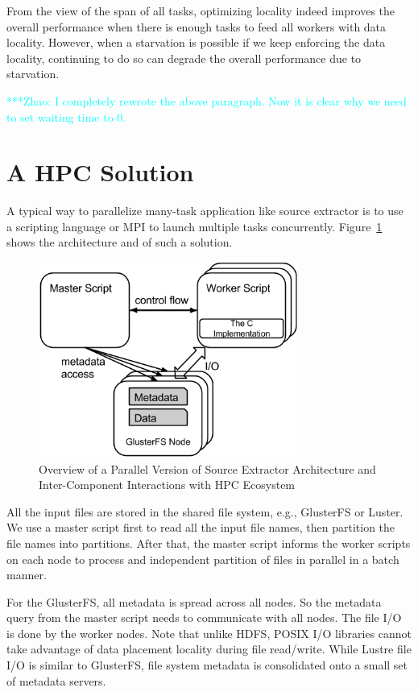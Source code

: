 \documentclass[conference]{IEEEtran}
\newcommand{\zhaonote}[1]{{\textcolor{cyan}    { ***Zhao:      #1 }}}
\newcommand{\zhaonote}[1]{}
\newcommand{\up}{\vspace*{-1em}}
\begin{document}
From the view of the span of all tasks, optimizing locality indeed improves the overall performance when there is enough
tasks to feed all workers with data locality. However, when a starvation is possible if we keep
enforcing the data locality, continuing to do so can degrade the overall performance due to starvation.

\zhaonote{I completely rewrote the above paragraph. Now it is clear why we need to set waiting time to 0.}

\section{A HPC Solution}
A typical way to parallelize many-task application like source extractor is to use a scripting language
or MPI to launch multiple tasks concurrently. Figure~\ref{fig:hpc-architecture} shows the architecture and
of such a solution.

\begin{figure}[t]
	\begin{center}
		\includegraphics[width=85mm]{pictures/HPC-Architecture}
		\caption{Overview of a Parallel Version of Source Extractor Architecture and Inter-Component Interactions with HPC Ecosystem}
		\label{fig:hpc-architecture}
		\up\up
  	\end{center}
\end{figure}

All the input files are stored in the shared file system, e.g., GlusterFS or Luster. We use a master script
first to read all the input file names, then partition the file names into partitions. After that, the master
script informs the worker scripts on each node to process and independent partition of files in parallel 
in a batch manner.

For the GlusterFS, all metadata is spread across all nodes. So the metadata query from the master script
needs to communicate with all nodes. The file I/O is done by the worker nodes. Note that unlike HDFS, 
POSIX I/O libraries cannot take advantage of data placement locality during file read/write. While Lustre 
file I/O is similar to GlusterFS, file system metadata is consolidated onto a small set of metadata servers.
\end{document}

